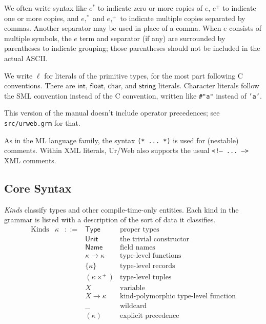 \documentclass{article}
\newcommand{\mt}[1]{\mathsf{#1}}
\begin{document}
We often write syntax like $e^*$ to indicate zero or more copies of $e$, $e^+$ to indicate one or more copies, and $e,^*$ and $e,^+$ to indicate multiple copies separated by commas.  Another separator may be used in place of a comma.  When $e$ consists of multiple symbols, the $e$ term and separator (if any) are surrounded by parentheses to indicate grouping; those parentheses should not be included in the actual ASCII.

We write $\ell$ for literals of the primitive types, for the most part following C conventions.  There are $\mt{int}$, $\mt{float}$, $\mt{char}$, and $\mt{string}$ literals.  Character literals follow the SML convention instead of the C convention, written like \texttt{\#"a"} instead of \texttt{'a'}.

This version of the manual doesn't include operator precedences; see \texttt{src/urweb.grm} for that.

As in the ML language family, the syntax \texttt{(* ... *)} is used for (nestable) comments.  Within XML literals, Ur/Web also supports the usual \texttt{<!-- ... -->} XML comments.

\subsection{\label{core}Core Syntax}

\emph{Kinds} classify types and other compile-time-only entities.  Each kind in the grammar is listed with a description of the sort of data it classifies.
$$\begin{array}{rrcll}
  \textrm{Kinds} & \kappa &::=& \mt{Type} & \textrm{proper types} \\
  &&& \mt{Unit} & \textrm{the trivial constructor} \\
  &&& \mt{Name} & \textrm{field names} \\
  &&& \kappa \to \kappa & \textrm{type-level functions} \\
  &&& \{\kappa\} & \textrm{type-level records} \\
  &&& (\kappa\times^+) & \textrm{type-level tuples} \\
  &&& X & \textrm{variable} \\
  &&& X \longrightarrow \kappa & \textrm{kind-polymorphic type-level function} \\
  &&& \_\_ & \textrm{wildcard} \\
  &&& (\kappa) & \textrm{explicit precedence} \\
\end{array}$$
\end{document}
